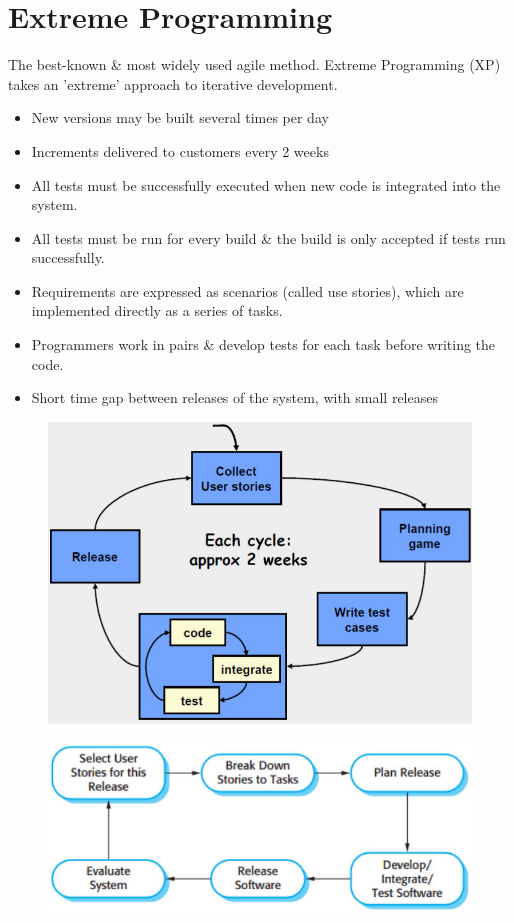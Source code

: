 \documentclass{report}
\begin{document}
\section{Extreme Programming}
\vspace{-1em}
\begin{multicols}{2}
\noindent The best-known \& most widely used agile method. Extreme Programming (XP) takes an 'extreme' approach to iterative development.
\begin{itemize}
  \item New versions may be built several times per day
  \item Increments delivered to customers every 2 weeks
  \item All tests must be successfully executed when new code is integrated into the system.
  \item All tests must be run for every build \& the build is only accepted if tests run successfully.
  \item Requirements are expressed as scenarios (called use stories), which are implemented directly as a series of tasks.
  \item Programmers work in pairs \& develop tests for each task before writing the code.
  \item Short time gap between releases of the system, with small releases
\end{itemize}
\begin{figure}[H]
\centering
\includegraphics[scale=.25,trim=1cm 1cm 1cm 1cm]{assets/CEN4010_Agile_XP.jpg}
\end{figure}
\begin{figure}[H]
\centering
\includegraphics[scale=.35,trim=1cm 1cm 1cm 1cm]{assets/CEN4010_Agile_XP_Release_Cycle.jpg}
\end{figure}
\end{multicols}
\end{document}

